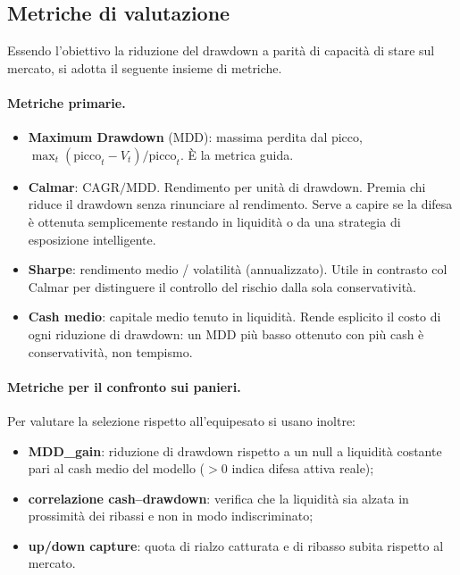 \subsection{Metriche di valutazione}
Essendo l'obiettivo la riduzione del drawdown a parità di
capacità di stare sul mercato, si adotta il seguente insieme di metriche.

\paragraph{Metriche primarie.}
\begin{itemize}
  \item \textbf{Maximum Drawdown} (MDD): massima perdita dal picco,
        $\max_t (\text{picco}_t - V_t)/\text{picco}_t$. È la metrica guida.
  \item \textbf{Calmar}: $\text{CAGR}/\text{MDD}$. Rendimento per unità di
        drawdown. Premia chi riduce il drawdown senza rinunciare al
        rendimento. Serve a capire se la difesa è ottenuta semplicemente restando in liquidità o da una strategia di esposizione intelligente.
  \item \textbf{Sharpe}: rendimento medio / volatilità (annualizzato).
        Utile in contrasto col Calmar per
        distinguere il controllo del rischio dalla sola conservatività.
  \item \textbf{Cash medio}: capitale medio tenuto in liquidità. Rende esplicito il
        costo di ogni riduzione di drawdown: un MDD più basso ottenuto
        con più cash è conservatività, non tempismo.
\end{itemize}

\paragraph{Metriche per il confronto sui panieri.}
Per valutare la selezione rispetto all'equipesato si usano inoltre:
\begin{itemize}
  \item \textbf{MDD\_gain}: riduzione di drawdown rispetto a un null a liquidità
        costante pari al cash medio del modello ($>0$ indica difesa attiva reale);
  \item \textbf{correlazione cash--drawdown}: verifica che la liquidità sia
        alzata in prossimità dei ribassi e non in modo indiscriminato;
  \item \textbf{up/down capture}: quota di rialzo catturata e di ribasso subita
        rispetto al mercato.
\end{itemize}

